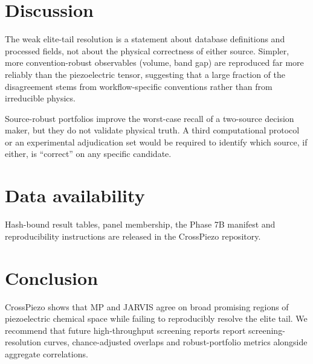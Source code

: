 \documentclass[11pt]{article}
\begin{document}
\section{Discussion}
The weak elite-tail resolution is a statement about database definitions and processed fields, not about the physical correctness of either source.
Simpler, more convention-robust observables (volume, band gap) are reproduced far more reliably than the piezoelectric tensor, suggesting that a large fraction of the disagreement stems from workflow-specific conventions rather than from irreducible physics.

Source-robust portfolios improve the worst-case recall of a two-source decision maker, but they do not validate physical truth.
A third computational protocol or an experimental adjudication set would be required to identify which source, if either, is ``correct'' on any specific candidate.

\section{Data availability}
Hash-bound result tables, panel membership, the Phase 7B manifest and reproducibility instructions are released in the CrossPiezo repository.

\section{Conclusion}
CrossPiezo shows that MP and JARVIS agree on broad promising regions of piezoelectric chemical space while failing to reproducibly resolve the elite tail.
We recommend that future high-throughput screening reports report screening-resolution curves, chance-adjusted overlaps and robust-portfolio metrics alongside aggregate correlations.



\end{document}
